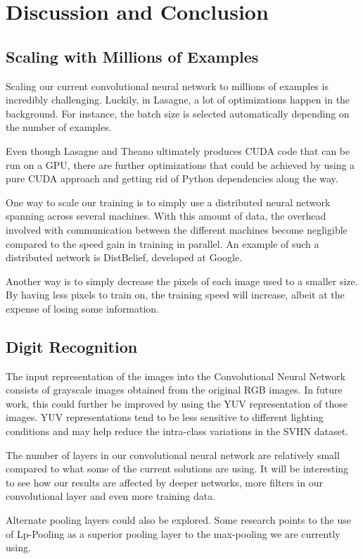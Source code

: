 \documentclass{article} %
\begin{document}
\section{Discussion and Conclusion}
\subsection{Scaling with Millions of Examples}
Scaling our current convolutional neural network to millions of examples is incredibly challenging. Luckily, in Lasagne, a lot of optimizations happen in the background. For instance, the batch size is selected automatically depending on the number of examples.

Even though Lasagne and Theano ultimately produces CUDA code that can be run on a GPU, there are further optimizations that could be achieved by using a pure CUDA approach and getting rid of Python dependencies along the way. 

One way to scale our training is to simply use a distributed neural network spanning across several machines. With this amount of data, the overhead involved with communication between the different machines become negligible compared to the speed gain in training in parallel. An example of such a distributed network is DistBelief\cite{dean2012large}, developed at Google.

Another way is to simply decrease the pixels of each image used to a smaller size. By having less pixels to train on, the training speed will increase, albeit at the expense of losing some information.

\subsection{Digit Recognition}
The input representation of the images into the Convolutional Neural Network consists of grayscale images obtained from the original RGB images. In future work, this could further be improved by using the YUV representation of those images. YUV representations tend to be less sensitive to different lighting conditions and may help reduce the intra-class variations in the SVHN dataset.

The number of layers in our convolutional neural network are relatively small compared to what some of the current solutions are using. It will be interesting to see how our results are affected by deeper networks, more filters in our convolutional layer and even more training data. 

Alternate pooling layers could also be explored. Some research points to the use of Lp-Pooling\cite{lecun_convolutional_svhn} as a superior pooling layer to the max-pooling we are currently using.
\end{document}
